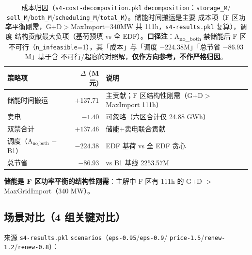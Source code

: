 \documentclass{internal-report}
\begin{document}
\begin{table}[H]
\centering
\footnotesize
\begin{tabular}{lrl}
\toprule
策略项 & $\Delta$ (M元) & 说明 \\
\midrule
储能时间搬运 & $+137.71$ & 主贡献；F 区结构性刚需（G+D$>$MaxImport 111h） \\
卖电 & $-1.40$ & 可忽略（六区合计仅 24.88 GWh） \\
双禁合计 & $+137.46$ & 储能+卖电联合贡献 \\
调度（A$_{\text{no\_both}}$ $-$ B1） & $-224.38$ & EDF 基荷 vs 全 EDF 贪心 \\
\midrule
总节省 & $-86.93$ & vs B1 基线 2253.57M \\
\bottomrule
\end{tabular}
\caption{成本归因（\texttt{s4-cost-decomposition.pkl} \texttt{decomposition}：\texttt{storage\_M}/
\texttt{sell\_M}/\texttt{both\_M}/\texttt{scheduling\_M}/\texttt{total\_M}）。储能时间搬运是主要
成本项（F 区功率平衡刚需，G+D$>$MaxImport=340MW 共 111h，\texttt{s4-results.pkl} 复算），调度
结构贡献最大负项（基荷预填 vs 全 EDF）。\textbf{口径注}：A\textsubscript{no\_both} 禁储能后 F 区
不可行（\texttt{n\_infeasible}=1），其「成本」与「调度 $-224.38$M」「总节省 $-86.93$M」基于含
不可行/超容的对照解，\textbf{仅作方向参考，不作严格归因}。}
\label{tab:decomp}
\end{table}

\textbf{储能是 F 区功率平衡的结构性刚需}：主解中 F 区有 111h 的 G+D $>$ MaxGridImport（340 MW）。

\subsection{场景对比（4 组关键对比）}
\label{sec:scenario}

来源 \texttt{s4-results.pkl} \texttt{scenarios}（\texttt{eps-0.95}/\texttt{eps-0.9}/
\texttt{price-1.5}/\texttt{renew-1.2}/\texttt{renew-0.8}）：
\end{document}
